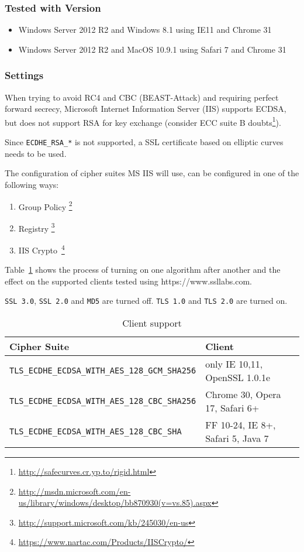 
\subsubsection{Tested with Version} 

\begin{itemize}
\item Windows Server 2012 R2 and Windows 8.1 using IE11 and Chrome 31
\item Windows Server 2012 R2 and MacOS 10.9.1 using Safari 7 and Chrome 31
\end{itemize}

\subsubsection{Settings}


When trying to avoid RC4 and CBC (BEAST-Attack) and requiring perfect
forward secrecy, Microsoft Internet Information Server (IIS) supports
ECDSA, but does not support RSA for key exchange (consider ECC suite
B doubts\footnote{\url{http://safecurves.cr.yp.to/rigid.html}}).

Since \verb|ECDHE_RSA_*| is not supported, a SSL certificate based on
elliptic curves needs to be used.

The configuration of cipher suites MS IIS will use, can be configured in one
of the following ways:
\begin{enumerate}
\item Group Policy \footnote{\url{http://msdn.microsoft.com/en-us/library/windows/desktop/bb870930(v=vs.85).aspx}}
\item Registry \footnote{\url{http://support.microsoft.com/kb/245030/en-us}}
\item IIS Crypto~\footnote{\url{https://www.nartac.com/Products/IISCrypto/}}
\end{enumerate}


Table~\ref{tab:MS_IIS_Client_Support} shows the process of turning on
one algorithm after another and the effect on the supported clients
tested using https://www.ssllabs.com.

\verb|SSL 3.0|, \verb|SSL 2.0| and \verb|MD5| are turned off.
\verb|TLS 1.0| and \verb|TLS 2.0| are turned on.

\begin{table}[h]
  \centering
  \small
  \begin{tabular}{ll}
    \toprule
    Cipher Suite & Client \\
    \midrule
    \verb|TLS_ECDHE_ECDSA_WITH_AES_128_GCM_SHA256| & only IE 10,11, OpenSSL 1.0.1e \\
    \verb|TLS_ECDHE_ECDSA_WITH_AES_128_CBC_SHA256| & Chrome 30, Opera 17, Safari 6+ \\
    \verb|TLS_ECDHE_ECDSA_WITH_AES_128_CBC_SHA| & FF 10-24, IE 8+, Safari 5, Java 7\\
    \bottomrule 
 \end{tabular}
  \caption{Client support}
  \label{tab:MS_IIS_Client_Support}
\end{table}

